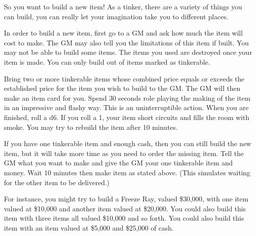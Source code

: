 \documentclass[green]{LRSguildcamp1}
\begin{document}
\name{\gTinkering{}}

So you want to build a new item! As a tinker, there are a variety of things you can build, you can really let your imagination take you to different places. 

In order to build a new item, first go to a GM and ask how much the item will cost to make. The GM may also tell you the limitations of this item if built. You may not be able to build some items. The items you used are destroyed once your item is made. You can only build out of items marked as tinkerable.

Bring two or more tinkerable items whose combined price equals or exceeds the established price for the item you wish to build to the GM. 
The GM will then make an item card for you. Spend 30 seconds role playing the making of the item in an impressive and flashy way. This is an uninterruptible action. When you are finished, roll a d6.  If you roll a 1, your item short circuits and fills the room with smoke. You may try to rebuild the item after 10 minutes. 

If you have one tinkerable item and enough cash, then you can still build the new item, but it will take more time as you need to order the missing item. Tell the GM what you want to make and give the GM your one tinkerable item and money. Wait 10 minutes then make item as stated above. (This simulates waiting for the other item to be delivered.) 

For instance, you might try to build a Freeze Ray, valued \$30,000, with one item valued at \$10,000 and another item valued at \$20,000. You could also build this item with three items all valued \$10,000 and so forth. You could also build this item with an item valued at \$5,000 and \$25,000 of cash. 

\end{document}
